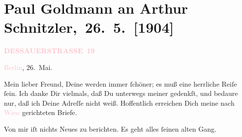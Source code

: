 

\renewcommand{\erwaehntePersonen}{Personen: Johannes Nielsen, Olga Schnitzler}
\renewcommand{\erwaehnteOrte}{Orte: Berlin, Dessauer Straße, Det Kongelige Teater, Kopenhagen, Wien}
\renewcommand{\erwaehnteWerke}{Werke: Lebendige Stunden. Vier Einakter, Levende Timer. Skuespil i 1 akt}
\section[ Paul Goldmann an Arthur Schnitzler, 26. 5. {[}1904{]}]{Paul Goldmann an Arthur Schnitzler, 26. 5. {[}1904{]}}
\nopagebreak{}
\rehead{ }\normalsize\beginnumbering{}
\toendnotes[C]{\smallbreak\pagebreak[2]}
\toendnotes[C]{\smallbreak}
\pstart
           \noindent{}\raggedleft{}{\pb}\textcolor{gray}{\textbf{\textcolor{pink}{DESSAUERSTRASSE 19}{}\ledrightnote{\textcolor{pink}{Dessauer Straße}}}}\pend
           
\pstart
           \textcolor{pink}{Berlin}{}\ledrightnote{\textcolor{pink}{Berlin}}, 26. Mai.\pend
           
\pstart{}Mein lieber Freund,\pend
\pstart
           Deine \label{K_L03444-1v}\label{K_L03444-1h} werden immer ſchöner;  es muß eine
               herrliche Reiſe ſein. Ich danke Dir vielmals, daß Du unterwegs meiner gedenkſt, und
               bedaure nur, daß ich Deine Adreſſe nicht weiß. Hoffentlich erreichen Dich meine nach
                  \textcolor{pink}{Wien}{}\ledrightnote{\textcolor{pink}{Wien}} gerichteten Briefe.\pend
           
\pstart
           Von mir iſt nichts Neues zu berichten. Es geht alles ſeinen alten Gang.\pend
           
